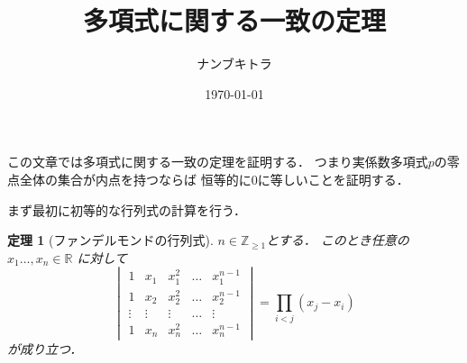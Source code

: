 \documentclass[leqno, a4paper, 12pt]{jsarticle}
\title{
多項式に関する一致の定理
}
\author{ナンブキトラ}
\date{\today}
\newtheorem{thm}{定理}
\newcommand{\zz}{\mathbb{Z}}
\newcommand{\rr}{\mathbb{R}}
\begin{document}
\maketitle

この文章では多項式に関する一致の定理を証明する．
つまり実係数多項式$p$の零点全体の集合が内点を持つならば
恒等的に$0$に等しいことを証明する．

まず最初に初等的な行列式の計算を行う．
\begin{thm}[ファンデルモンドの行列式]
$n\in \zz_{\ge 1}$とする．
このとき任意の$x_{1}\dots, x_{n}\in \rr$
に対して
\[
\begin{vmatrix}
1 & x_{1} & x_{1}^{2} & \dots & x_{1}^{n-1}\\
1 & x_{2} & x_{2}^{2} & \dots & x_{2}^{n-1}\\
\vdots & \vdots  &  \vdots & \dots &\vdots\\
1 & x_{n} & x_{n}^{2} & \dots & x_{n}^{n-1}
\end{vmatrix}
=\prod_{i<j}(x_{j}-x_{i})
\]
が成り立つ．
\end{thm}
\end{document}
